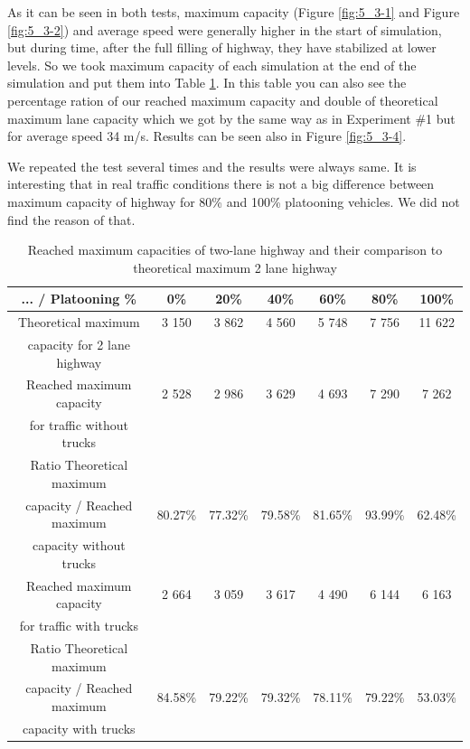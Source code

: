 As it can be seen in both tests, maximum capacity (Figure \ref{fig:5_3-1} and Figure \ref{fig:5_3-2}) and average speed were generally higher in the start of simulation, but during time, after the full filling of highway, they have stabilized at lower levels. So we took maximum capacity of each simulation at the end of the simulation and put them into Table \ref{tab:5_3-1}. In this table you can also see the percentage ration of our reached maximum capacity and double of theoretical maximum lane capacity which we got by the same way as in Experiment \#1 but for average speed 34 m/s. Results can be seen also in Figure \ref{fig:5_3-4}.

We repeated the test several times and the results were always same. It is interesting that in real traffic conditions there is not a big difference between maximum capacity of highway for 80\% and 100\% platooning vehicles. We did not find the reason of that.

\begin{table}[ph]
\begin{centering}
\begin{tabular}{|c|c|c|c|c|c|c|}
\hline 
... / Platooning \%&	0\% &	20\% &	40\% &	60\% &	80\% &	100\%\tabularnewline
\hline 
Theoretical maximum &	3 150 &	3 862 &	4 560 &	5 748 &	7 756 &	11 622\tabularnewline
 capacity for 2 lane highway & & & & & &\tabularnewline
\hline 
Reached maximum capacity & 2 528 &	2 986 &	3 629 &	4 693 &	7 290 &	7 262\tabularnewline
for traffic without trucks & & & & & &\tabularnewline
\hline 
Ratio Theoretical maximum & & & & & &\tabularnewline
capacity / Reached maximum & 80.27\% &	77.32\%	 & 79.58\% &	81.65\% &	93.99\% &	62.48\%
\tabularnewline
capacity without trucks & & & & & &\tabularnewline
\hline 
Reached maximum capacity & 2 664 &	3 059 &	3 617 &	4 490 &	6 144 &	6 163\tabularnewline
for traffic with trucks & & & & & &\tabularnewline
\hline 
Ratio Theoretical maximum & & & & & &\tabularnewline
capacity / Reached maximum & 84.58\% &	79.22\% &	79.32\% &	78.11\% &	79.22\% &	53.03\%\tabularnewline
capacity with trucks & & & & & &\tabularnewline
\hline 
\end{tabular}
\centering
\protect\caption{\label{tab:5_3-1}Reached maximum capacities of two-lane highway and their comparison to theoretical maximum 2 lane highway}
\end{centering}
\end{table}

